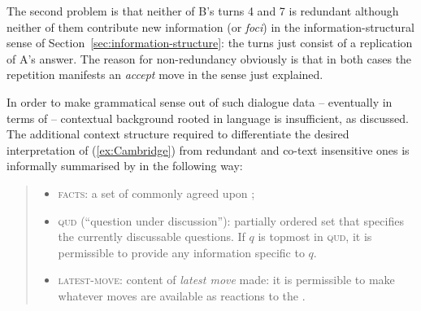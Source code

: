 \documentclass[output=paper]{langsci/langscibook}
\begin{document}
{The second problem is that neither of B's turns 4 and 7 is redundant although neither of them contribute new information (or \emph{foci}) in the information-structural sense of Section~\ref{sec:information-structure}: the turns just consist of a replication of A's answer.
%
The reason for non-redundancy obviously is that in both cases the repetition manifests an \emph{accept}  move in the sense just explained.


In order to make grammatical sense out of such dialogue data -- eventually in terms of  -- contextual background rooted in language  is insufficient, as discussed.
%
The additional context structure required to differentiate the desired interpretation of (\ref{ex:Cambridge}) from redundant and co-text insensitive ones is informally summarised by \citet[]{Ginzburg:1994} in the following way:
%
\begin{quote}
  \begin{itemize}
  \item \textsc{facts}:  a set of commonly agreed upon ;
  \item \textsc{qud}  (\enquote{question under discussion}):  partially ordered set that specifies the currently discussable questions. If $q$ is topmost in \textsc{qud}, it is permissible to provide any information specific to $q$.
  \item \textsc{latest-move}:  content of \emph{latest move} made: it is permissible to make whatever moves are available as reactions to the .
  \end{itemize}
\end{quote}

}
\end{document}
